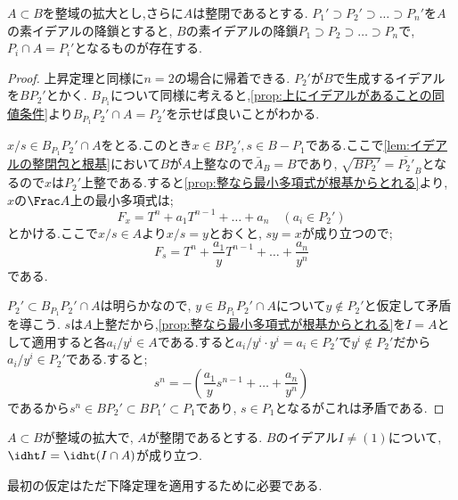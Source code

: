 \begin{thm}[下降定理]\label{thm:going down}
	$A\subset B$を整域の拡大とし,さらに$A$は整閉であるとする. $P_1'\supset P_2'\supset\dots\supset P_n'$を$A$の素イデアルの降鎖とすると, $B$の素イデアルの降鎖$P_1\supset P_2\supset\dots\supset P_n$で, $P_i\cap A=P_i'$となるものが存在する.
\end{thm}

\begin{proof}
	上昇定理と同様に$n=2$の場合に帰着できる. $P_2'$が$B$で生成するイデアルを$BP_2'$とかく. $B_{P_1}$について同様に考えると,\ref{prop:上にイデアルがあることの同値条件}より$B_{P_1}P_2'\cap A=P_2'$を示せば良いことがわかる.
	
	$x/s\in B_{P_1}P_2'\cap A$をとる.このとき$x\in BP_2',s\in B-P_1$である.ここで\ref{lem:イデアルの整閉包と根基}において$B$が$A$上整なので$\bar{A}_B=B$であり, $\sqrt{BP_2'}=\bar{P_2'}_B$となるので$x$は$P_2'$上整である.すると\ref{prop:整なら最小多項式が根基からとれる}より, $x$の$\Frac A$上の最小多項式は;
	\[F_x=T^n+a_1T^{n-1}+\dots+a_n\quad(a_i\in P_2')\]
	とかける.ここで$x/s\in A$より$x/s=y$とおくと, $sy=x$が成り立つので;
	\[F_s=T^n+\frac{a_1}{y}T^{n-1}+\dots+\frac{a_n}{y^n}\]
	である. 
	
	$P_2'\subset B_{P_1}P_2'\cap A$は明らかなので, $y\in B_{P_1}P_2'\cap A$について$y\not\in P_2'$と仮定して矛盾を導こう. $s$は$A$上整だから,\ref{prop:整なら最小多項式が根基からとれる}を$I=A$として適用すると各$a_i/y^i\in A$である.すると$a_i/y^i\cdot y^i=a_i\in P_2'$で$y^i\not\in P_2'$だから$a_i/y^i\in P_2'$である.すると;
	\[s^n=-\left(\frac{a_1}{y}s^{n-1}+\dots+\frac{a_n}{y^n}\right)\]
	であるから$s^n\in BP_2'\subset BP_1'\subset P_1$であり, $s\in P_1$となるがこれは矛盾である.
\end{proof}
\begin{cor}\label{cor:上にあるイデアルの高さ}
	$A\subset B$が整域の拡大で, $A$が整閉であるとする. $B$のイデアル$I\neq(1)$について, $\idht I=\idht (I\cap A)$が成り立つ.	
\end{cor}

最初の仮定はただ下降定理を適用するために必要である.

